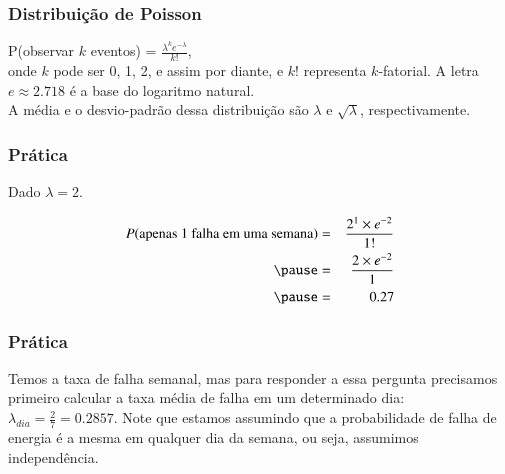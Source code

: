 \begin{frame}
\frametitle{Distribuição de Poisson}

\vfill
\justifying
{}
{
P(observar $ k $ eventos) = $\frac{\lambda^k e^{-\lambda}}{k!}$, \\
\vspace{0.5 cm}
\justifying
onde $k$ pode ser 0, 1, 2, e assim por diante, e $k!$ representa $ k $-fatorial. A letra $e \approx 2.718$ é a base do logaritmo natural. \\
\vspace{0.5 cm}
\justifying
A média e o desvio-padrão dessa distribuição são $ \lambda $ e $ \sqrt{\lambda} $, respectivamente.
}

\end{frame}


\begin{frame}
\frametitle{Prática}
\justifying
{}

\pause
\justifying
Dado $\lambda = 2$.

\pause

\begin{eqnarray*}
P(\text{apenas 1 falha em uma semana}) &=& \frac{2^1 \times e^{-2}}{1!} \\
\pause
&=& \frac{2 \times e^{-2}}{1} \\
\pause
&=& 0.27
\end{eqnarray*}

\end{frame}


\begin{frame}
\frametitle{Prática}
\justifying
{}

\pause
\justifying
Temos a taxa de falha semanal, mas para responder a essa pergunta precisamos primeiro calcular a taxa média de falha em um determinado dia: $\lambda_{dia} = \frac{2}{7} = 0.2857$. Note que estamos assumindo que a probabilidade de falha de energia é a mesma em qualquer dia da semana, ou seja, assumimos independência.


\end{frame}

